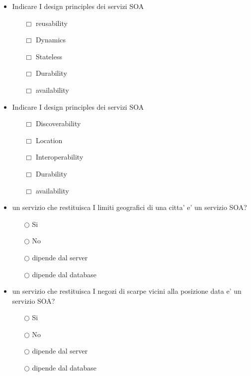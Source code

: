 \documentclass[10pt,twocolumn]{article}
\begin{document}
\begin{itemize}
    \item Indicare I design principles dei servizi SOA
          \begin{itemize}
              \item[$\Box$] reusability
              \item[$\Box$] Dynamics
              \item[$\Box$] Stateless
              \item[$\Box$] Durability
              \item[$\Box$] availability
          \end{itemize}
\end{itemize}
\begin{itemize}
    \item Indicare I design principles dei servizi SOA
          \begin{itemize}
              \item[$\Box$] Discoverability
              \item[$\Box$] Location
              \item[$\Box$] Interoperability
              \item[$\Box$] Durability
              \item[$\Box$] availability
          \end{itemize}
\end{itemize}
\begin{itemize}
    \item un servizio che restituisca I limiti geografici di una citta' e' un servizio SOA?
          \begin{itemize}
              \item[$\bigcirc$] Si
              \item[$\bigcirc$] No
              \item[$\bigcirc$] dipende dal server
              \item[$\bigcirc$] dipende dal database
          \end{itemize}
\end{itemize}
\begin{itemize}
    \item un servizio che restituisca I negozi di scarpe vicini alla posizione data e' un servizio SOA?
          \begin{itemize}
              \item[$\bigcirc$] Si
              \item[$\bigcirc$] No
              \item[$\bigcirc$] dipende dal server
              \item[$\bigcirc$] dipende dal database
          \end{itemize}
\end{itemize}
\end{document}

